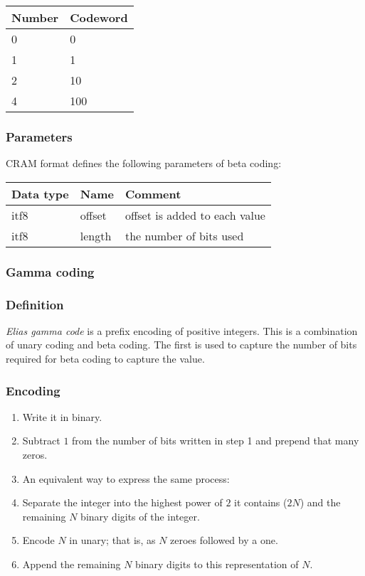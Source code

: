 \documentclass[a4paper]{article}
\begin{document}
\begin{tabular}{|>{\raggedright}p{222pt}|>{\raggedright}p{222pt}|}
\hline
\textbf{Number} & \textbf{Codeword}\tabularnewline
\hline
0 & 0\tabularnewline
\hline
1 & 1\tabularnewline
\hline
2 & 10\tabularnewline
\hline
4 & 100\tabularnewline
\hline
\end{tabular}

\subsubsection*{Parameters}

CRAM format defines the following parameters of beta coding: 

\begin{tabular}{|>{\raggedright}p{144pt}|>{\raggedright}p{144pt}|>{\raggedright}p{144pt}|}
\hline
\textbf{Data type} & \textbf{Name} & \textbf{Comment}\tabularnewline
\hline
itf8 & offset & offset is added to each value\tabularnewline
\hline
itf8 & length & the number of bits used\tabularnewline
\hline
\end{tabular}

\subsubsection*{Gamma coding}

\subsubsection*{Definition}

\emph{Elias gamma code} is a prefix encoding of positive integers. This is a combination 
of unary coding and beta coding. The first is used to capture the number of bits 
required for beta coding to capture the value. 

\subsubsection*{Encoding}

\begin{enumerate}
\item Write it in binary.

\item Subtract $1$ from the number of bits written in step 1 and prepend that many zeros.

\item An equivalent way to express the same process:

\item Separate the integer into the highest power of $2$ it contains ($2N$) and the remaining 
$N$ binary digits of the integer.

\item Encode $N$ in unary; that is, as $N$ zeroes followed by a one.

\item Append the remaining $N$ binary digits to this representation of $N$.
\end{enumerate}
\end{document}
